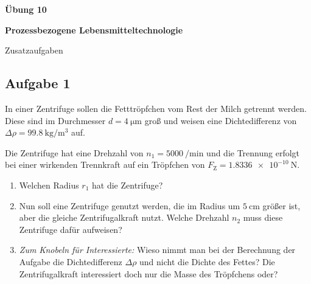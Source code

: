 \documentclass[a4paper,11pt]{article}
\begin{document}


\begin{center}
\LARGE
\color{uniblau}
\textbf{Übung 10} \par \vspace*{2mm}
\large \color{miugray!50!black} \textbf{Prozessbezogene Lebensmitteltechnologie}\par 
\normalsize Zusatzaufgaben
\end{center}
\par 


\color{miudiutex}


\subsection*{Aufgabe 1}

In einer Zentrifuge sollen die Fetttröpfchen vom Rest der Milch getrennt werden. Diese sind im Durchmesser $d = \qty{4}{\micro\metre}$ groß und weisen eine Dichtedifferenz von $\Delta\rho = \qty{99,8}{\kilo\gram\per\metre\cubed}$ auf. 

Die Zentrifuge hat eine Drehzahl von $n_1 = \qty{5000}{\per\minute}$ und die Trennung erfolgt bei einer wirkenden Trennkraft auf ein Tröpfchen von $F_{\text{Z}} = \qty{1,8336e-10}{\newton}$.

\begin{enumerate}[label=\textbf{\alph*)}]
    \item Welchen Radius $r_1$ hat die Zentrifuge?
    \item Nun soll eine Zentrifuge genutzt werden, die im Radius um $\qty{5}{\centi\metre}$ größer ist, aber die gleiche Zentrifugalkraft nutzt. Welche Drehzahl $n_2$ muss diese Zentrifuge dafür aufweisen?
    \item \textit{Zum Knobeln für Interessierte:} Wieso nimmt man bei der Berechnung der Aufgabe die Dichtedifferenz $\Delta \rho$ und nicht die Dichte des Fettes? Die Zentrifugalkraft interessiert doch nur die Masse des Tröpfchens oder?
\end{enumerate}
\end{document}
